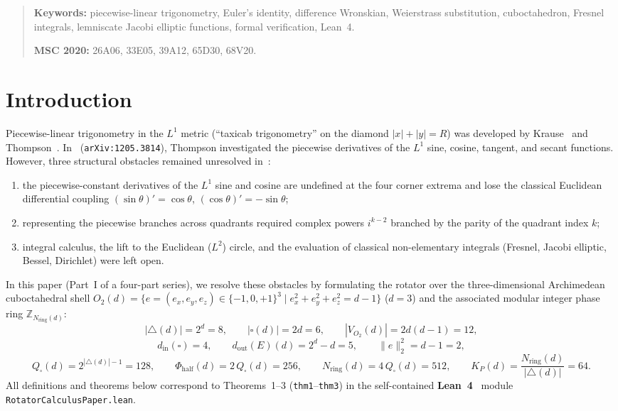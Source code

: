 \documentclass[11pt,a4paper]{article}
\theoremstyle{plain}
\theoremstyle{definition}
\begin{document}
\begin{abstract}
\medskip\noindent
\textbf{Keywords:} piecewise-linear trigonometry, Euler's identity, difference Wronskian, Weierstrass substitution, cuboctahedron, Fresnel integrals, lemniscate Jacobi elliptic functions, formal verification, Lean~4.

\smallskip\noindent
\textbf{MSC 2020:} 26A06, 33E05, 39A12, 65D30, 68V20.
\end{abstract}

\section{Introduction}
\label{sec:intro}

Piecewise-linear trigonometry in the $L^1$ metric (``taxicab trigonometry'' on the diamond $|x|+|y|=R$) was developed by Krause~\cite{Krause1986} and Thompson~\cite{Thompson2011,Thompson2012}. In~\cite{Thompson2012} (\texttt{arXiv:1205.3814}), Thompson investigated the piecewise derivatives of the $L^1$ sine, cosine, tangent, and secant functions. However, three structural obstacles remained unresolved in~\cite{Thompson2012}:
\begin{enumerate}[leftmargin=*,noitemsep]
\item the piecewise-constant derivatives of the $L^1$ sine and cosine are undefined at the four corner extrema and lose the classical Euclidean differential coupling $(\sin\theta)'=\cos\theta$, $(\cos\theta)'=-\sin\theta$;
\item representing the piecewise branches across quadrants required complex powers $i^{k-2}$ branched by the parity of the quadrant index $k$;
\item integral calculus, the lift to the Euclidean ($L^2$) circle, and the evaluation of classical non-elementary integrals (Fresnel, Jacobi elliptic, Bessel, Dirichlet) were left open.
\end{enumerate}

In this paper (Part~I of a four-part series), we resolve these obstacles by formulating the rotator over the three-dimensional Archimedean cuboctahedral shell $O_2(d) = \{e=(e_x,e_y,e_z)\in\{-1,0,+1\}^3 \mid e_x^2+e_y^2+e_z^2 = d-1\}$ ($d=3$) and the associated modular integer phase ring $\mathbb{Z}_{N_{\mathrm{ring}}(d)}$:
\[
  |{\triangle}(d)| = 2^d = 8,\qquad
  |\square(d)| = 2d = 6,\qquad
  |V_{O_2}(d)| = 2d(d-1) = 12,
\]
\[
  d_{\mathrm{in}}(\square) = 4,\qquad
  d_{\mathrm{out}}(E)(d) = 2^d - d = 5,\qquad
  \|e\|_2^2 = d - 1 = 2,
\]
\[
  Q_\square(d) = 2^{|{\triangle}(d)|-1} = 128,\qquad
  \Phi_{\mathrm{half}}(d) = 2\,Q_\square(d) = 256,\qquad
  N_{\mathrm{ring}}(d) = 4\,Q_\square(d) = 512,\qquad
  K_P(d) = \frac{N_{\mathrm{ring}}(d)}{|{\triangle}(d)|} = 64.
\]
All definitions and theorems below correspond to Theorems~1--3 (\texttt{thm1}--\texttt{thm3}) in the self-contained \textbf{Lean~4}~\cite{Moura2021} module \texttt{RotatorCalculusPaper.lean}.
\end{document}
